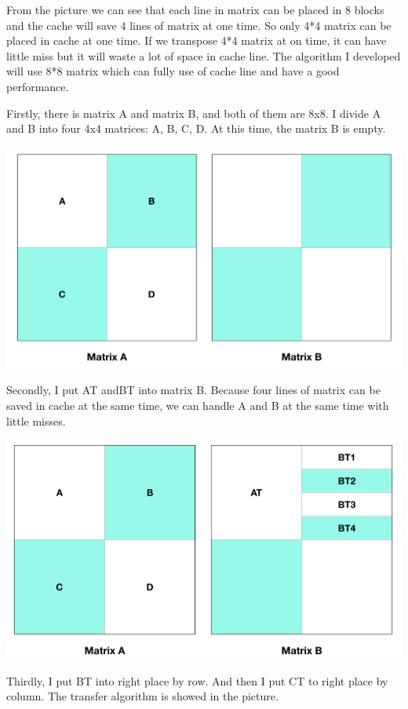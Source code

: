 \documentclass{article}
\begin{document}
From the picture we can see that each line in matrix can be placed in 8 blocks and the cache will save 4 lines of matrix at one time. So only 4*4 matrix can be placed in cache at one time. If we transpose 4*4 matrix at on time, it can have little miss but it will waste a lot of space in cache line. The algorithm I  developed will use 8*8 matrix which can fully use of cache line and have a good performance.

Firstly, there is matrix A and matrix B, and both of them are 8x8. I divide A and B into four 4x4 matrices: A, B, C, D. At this time, the matrix B is empty.

\includegraphics[scale=0.35]{4.png}

Secondly, I put AT andBT into matrix B. Because four lines of matrix can be saved in cache at the same time, we can handle  A and B at the same time with little misses.

\includegraphics[scale=0.35]{5.png}

Thirdly, I put BT into right place by row. And then I put CT to right place by column. The transfer algorithm is showed in the picture.
\end{document}
